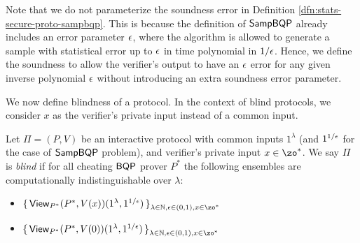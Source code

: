 \begin{remark} Note that we do not parameterize the soundness error in Definition \ref{dfn:stats-secure-proto-sampbqp}. This is because the definition of $\operatorname{\mathsf{SampBQP}}$ already includes an error parameter $\epsilon$, where the algorithm is allowed to generate a sample with statistical error up to $\epsilon$ in time polynomial in $1/\epsilon$. Hence, we define the soundness to  allow the verifier's output to have an $\epsilon$ error for any given inverse polynomial $\epsilon$ without introducing an extra soundness error parameter.
\end{remark}

We now define blindness of a protocol.
In the context of blind protocols, we consider $x$ as the verifier's private input instead of a common input.  


\begin{definition}[Blindness]
    Let $\Pi=(P, V)$ be an interactive protocol with common inputs $1^\lambda$ (and $1^{1/\epsilon}$ for the case of $\operatorname{\mathsf{SampBQP}}$ problem), and verifier's private input $x\in\zo^*$.
    We say $\Pi$ is \emph{blind} if for all cheating $\operatorname{\mathsf{BQP}}$ prover $P^*$ the following ensembles are computationally indistinguishable over $\lambda$:
    \begin{itemize}
        \item $\set{\View_{P^*}(P^*, V(x))(1^\lambda, 1^{1/\eps})}_{\lambda\in\bbN, \eps\in(0,1), x\in\zo^*}$
        \item $\set{\View_{P^*}(P^*, V(0))(1^\lambda, 1^{1/\eps})}_{\lambda\in\bbN, \eps\in(0,1), x\in\zo^*}$
    \end{itemize}
\end{definition}


\fi
